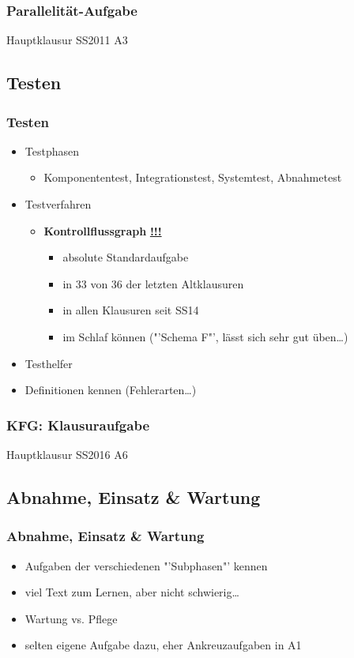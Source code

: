 \documentclass[18pt]{beamer}
\begin{document}
	\begin{frame}
		\frametitle{Parallelität-Aufgabe}
		\begin{huge}
				\centering Hauptklausur SS2011 A3
		\end{huge}
	\end{frame}
	
	\subsection{Testen}
	\begin{frame}
		\frametitle{Testen}
		\begin{itemize}
			\item Testphasen 
			\begin{itemize}
				\item Komponententest, Integrationstest, Systemtest, Abnahmetest \pause
			\end{itemize}
			\item Testverfahren
			\begin{itemize}
				\item \textbf{Kontrollflussgraph} \pause \textbf{\underline{!!!}}
				\begin{itemize}
					\item absolute Standardaufgabe \pause
					\item in 33 von 36 der letzten Altklausuren
					\item in allen Klausuren seit SS14
					\item im Schlaf können ("'Schema F"', lässt sich sehr gut üben\dots)
				\end{itemize}
			\end{itemize} \pause
			\item Testhelfer
			\item Definitionen kennen (Fehlerarten\dots)
		\end{itemize}
	\end{frame}

	\begin{frame}
	\frametitle{KFG: Klausuraufgabe}
	\begin{huge}
		\centering Hauptklausur SS2016 A6
	\end{huge}
	\end{frame}
	
	\subsection{Abnahme, Einsatz \& Wartung}
	\begin{frame}
		\frametitle{Abnahme, Einsatz \& Wartung}
		\begin{itemize}
			\item Aufgaben der verschiedenen "'Subphasen"' kennen \pause
			\item viel Text zum Lernen, aber nicht schwierig\dots \pause
			\item Wartung vs. Pflege \pause
			\item selten eigene Aufgabe dazu, eher Ankreuzaufgaben in A1
		\end{itemize}
	\end{frame}
\end{document}
